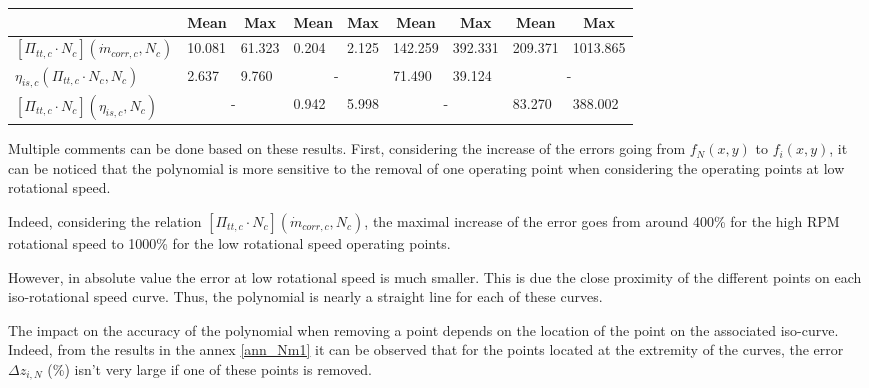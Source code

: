 \begin{longtable}[c]{@{}lclcl|clcl@{}}
\multicolumn{1}{c}{}                          & Mean                       & \multicolumn{1}{c}{Max} & Mean                      & \multicolumn{1}{c|}{Max} & Mean                        & \multicolumn{1}{c}{Max} & Mean                        & \multicolumn{1}{c}{Max} \\* \midrule
$[\Pi_{tt,c}\cdot N_c](\dot{m}_{corr,c},N_c)$ & \multicolumn{1}{l}{10.081} & 61.323                  & \multicolumn{1}{l}{0.204} & 2.125                    & \multicolumn{1}{l}{142.259} & 392.331                 & \multicolumn{1}{l}{209.371} & 1013.865                \\
$\eta_{is,c}(\Pi_{tt,c}\cdot N_c,N_c)$        & \multicolumn{1}{l}{2.637}  & 9.760                   & \multicolumn{2}{c|}{-}                               & \multicolumn{1}{l}{71.490}  & 39.124                  & \multicolumn{2}{c}{-}                                 \\
$[\Pi_{tt,c}\cdot N_c](\eta_{is,c},N_c)$      & \multicolumn{2}{c}{-}                                & \multicolumn{1}{l}{0.942} & 5.998                    & \multicolumn{2}{c}{-}                                 & \multicolumn{1}{l}{83.270}  & 388.002                 \\* \bottomrule
\end{longtable}

Multiple comments can be done based on these results. First, considering the increase of the errors going from $f_N(x,y)$ to $f_i(x,y)$, it can be noticed that the polynomial is more sensitive to the removal of one operating point when considering the operating points at low rotational speed.

Indeed, considering the relation $[\Pi_{tt,c}\cdot N_c](\dot{m}_{corr,c},N_c)$, the maximal increase of the error goes from around 400\% for the high RPM rotational speed to 1000\% for the low rotational speed operating points.

However, in absolute value the error at low rotational speed is much smaller. This is due the close proximity of the different points on each iso-rotational speed curve. Thus, the polynomial is nearly a straight line for each of these curves. 

The impact on the accuracy of the polynomial when removing a point depends on the location of the point on the associated iso-curve. Indeed, from the results in the annex \ref{ann_Nm1} it can be observed that for the points located at the extremity of the curves, the error $\Delta z_{i,N}$ (\%) isn't very large if one of these points is removed.

